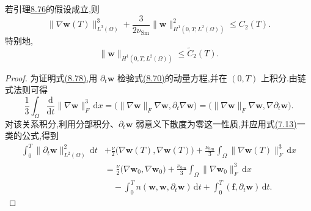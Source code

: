 \begin{lemma}
\label{lem:smagorinsky-h1-stability}
若引理\hyperref[lem:smagorinsky-l2-stability]{8.76}的假设成立,则
\begin{equation}\label{eq:smagorinsky-h1-stability}
 \|\nabla\bm{w}(T)\|_{L^3(\Omega)}^3
 +\frac{3}{2\nu_{\mathrm{Sm}}}
       \|\bm{w}\|_{H^1(0,T;L^2(\Omega))}^2
 \le C_2(T).
\end{equation}
特别地,
\[
 \|\bm{w}\|_{H^1(0,T;L^2(\Omega))}
 \le \widetilde C_2(T).
\]
\end{lemma}
\begin{proof}
为证明式\hyperref[eq:smagorinsky-h1-stability]{(8.78)},用 $\partial_t\bm{w}$ 检验式\hyperref[eq:smagorinsky-strong-form]{(8.70)}的动量方程,并在 $(0,T)$ 上积分.由链式法则可得
\[
 \frac13\int_\Omega\frac{\mathrm{d}}{\mathrm{d}t}
        \|\nabla\bm{w}\|_F^3\,\mathrm{d}x
 =\bigl(\|\nabla\bm{w}\|_F\nabla\bm{w},
                          \partial_t\nabla\bm{w}\bigr)
 =\bigl(\|\nabla\bm{w}\|_F\nabla\bm{w},
                          \nabla\partial_t\bm{w}\bigr).
\]
对该关系积分,利用分部积分、$\partial_t\bm{w}$ 弱意义下散度为零这一性质,并应用式\hyperref[eq:time-dependent-galerkin-product-rule]{(7.13)}一类的公式,得到
\begin{equation}\label{eq:smagorinsky-time-derivative-identity}
\begin{aligned}
 \int_0^T\|\partial_t\bm{w}\|_{L^2(\Omega)}^2\,\mathrm{d}t
 &+\frac{\nu}{2}
       \bigl(\nabla\bm{w}(T),\nabla\bm{w}(T)\bigr)
  +\frac{\nu_{\mathrm{Sm}}}{3}
       \int_\Omega\|\nabla\bm{w}(T)\|_F^3\,\mathrm{d}x\\
 &=\frac{\nu}{2}
       \bigl(\nabla\bm{w}_0,\nabla\bm{w}_0\bigr)
  +\frac{\nu_{\mathrm{Sm}}}{3}
       \int_\Omega\|\nabla\bm{w}_0\|_F^3\,\mathrm{d}x\\
 &\quad-\int_0^T n(\bm{w},\bm{w},\partial_t\bm{w})\,\mathrm{d}t
       +\int_0^T(\bm{f},\partial_t\bm{w})\,\mathrm{d}t.
\end{aligned}
\end{equation}


\end{proof}
